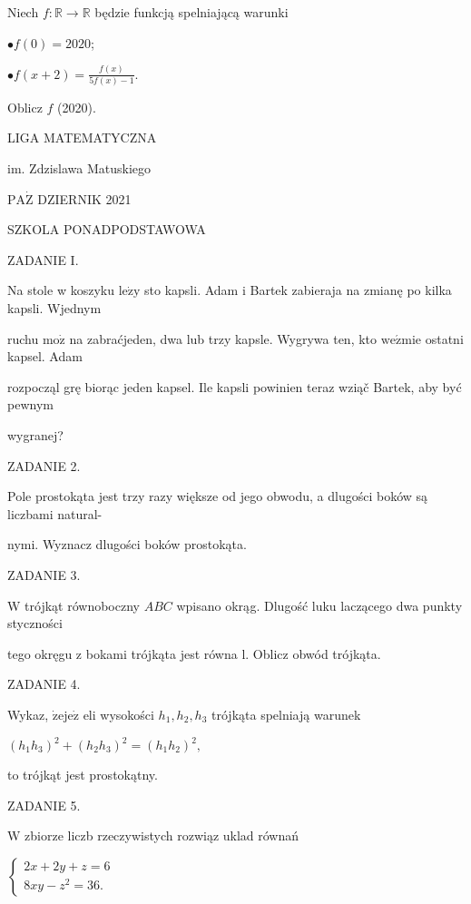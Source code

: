 \documentclass[a4paper,12pt]{article}
\begin{document}
Niech $f:\mathbb{R}\rightarrow \mathbb{R}$ będzie funkcją spelniającą warunki

$\bullet f(0)=2020$;

$\bullet f(x+2)=\displaystyle \frac{f(x)}{5f(x)-1}.$

Oblicz $f$ (2020).






LIGA MATEMATYCZNA

im. Zdzislawa Matuskiego

$\mathrm{P}\mathrm{A}\dot{\mathrm{Z}}$ DZIERNIK 2021

SZKOLA PONADPODSTAWOWA

ZADANIE I.

Na stole w koszyku $\mathrm{l}\mathrm{e}\dot{\mathrm{z}}\mathrm{y}$ sto kapsli. Adam i Bartek zabieraja na zmianę po kilka kapsli. Wjednym

ruchu $\mathrm{m}\mathrm{o}\dot{\mathrm{z}}$ na zabraćjeden, dwa lub trzy kapsle. Wygrywa ten, kto $\mathrm{w}\mathrm{e}\acute{\mathrm{z}}\mathrm{m}\mathrm{i}\mathrm{e}$ ostatni kapsel. Adam

rozpocząl grę biorąc jeden kapsel. Ile kapsli powinien teraz wziąč Bartek, aby być pewnym

wygranej?

ZADANIE 2.

Pole prostokąta jest trzy razy większe od jego obwodu, a dlugości boków są liczbami natural-

nymi. Wyznacz dlugości boków prostokąta.

ZADANIE 3.

$\mathrm{W}$ trójkąt równoboczny $ABC$ wpisano okrąg. Dlugość luku laczącego dwa punkty styczności

tego okręgu z bokami trójkąta jest równa l. Oblicz obwód trójkąta.

ZADANIE 4.

Wykaz, $\dot{\mathrm{z}}\mathrm{e}\mathrm{j}\mathrm{e}\dot{\mathrm{z}}$ eli wysokości $h_{1}, h_{2}, h_{3}$ trójkąta spelniają warunek

$(h_{1}h_{3})^{2}+(h_{2}h_{3})^{2}=(h_{1}h_{2})^{2},$

to trójkąt jest prostokątny.

ZADANIE 5.

$\mathrm{W}$ zbiorze liczb rzeczywistych rozwiąz uklad równań

$\left\{\begin{array}{l}
2x+2y+z=6\\
8xy-z^{2}=36.
\end{array}\right.$
\end{document}
